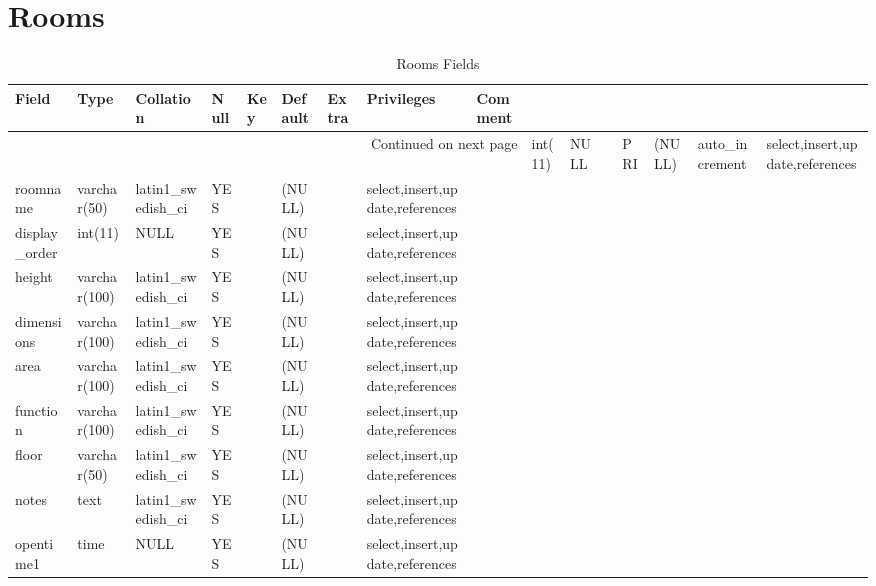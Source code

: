 \documentclass[tablesignature,landscape]{scrartcl}
\begin{document}
\section{Rooms}
\label{sec-22}


\begin{longtable}{|l|l|l|l|l|l|l|l|l|}
\caption{Rooms Fields} \label{tbl:roomsfields}\\
\hline
 Field             &  Type          &  Collation                &  Null  &  Key  &  Default  &  Extra              &  Privileges                       &  Comment \\
\hline
\endhead
\hline\multicolumn{9}{r}{Continued on next page}\
\endfoot
\endlastfoot
\hline
 roomid            &  int(11)       &  NULL                     &        &  PRI  &  (NULL)   &  auto\_{}increment  &  select,insert,update,references  &           \\
 roomname          &  varchar(50)   &  latin1\_{}swedish\_{}ci  &  YES   &       &  (NULL)   &                     &  select,insert,update,references  &           \\
 display\_{}order  &  int(11)       &  NULL                     &  YES   &       &  (NULL)   &                     &  select,insert,update,references  &           \\
 height            &  varchar(100)  &  latin1\_{}swedish\_{}ci  &  YES   &       &  (NULL)   &                     &  select,insert,update,references  &           \\
 dimensions        &  varchar(100)  &  latin1\_{}swedish\_{}ci  &  YES   &       &  (NULL)   &                     &  select,insert,update,references  &           \\
 area              &  varchar(100)  &  latin1\_{}swedish\_{}ci  &  YES   &       &  (NULL)   &                     &  select,insert,update,references  &           \\
 function          &  varchar(100)  &  latin1\_{}swedish\_{}ci  &  YES   &       &  (NULL)   &                     &  select,insert,update,references  &           \\
 floor             &  varchar(50)   &  latin1\_{}swedish\_{}ci  &  YES   &       &  (NULL)   &                     &  select,insert,update,references  &           \\
 notes             &  text          &  latin1\_{}swedish\_{}ci  &  YES   &       &  (NULL)   &                     &  select,insert,update,references  &           \\
 opentime1         &  time          &  NULL                     &  YES   &       &  (NULL)   &                     &  select,insert,update,references  &           \\

\end{longtable}
\end{document}
